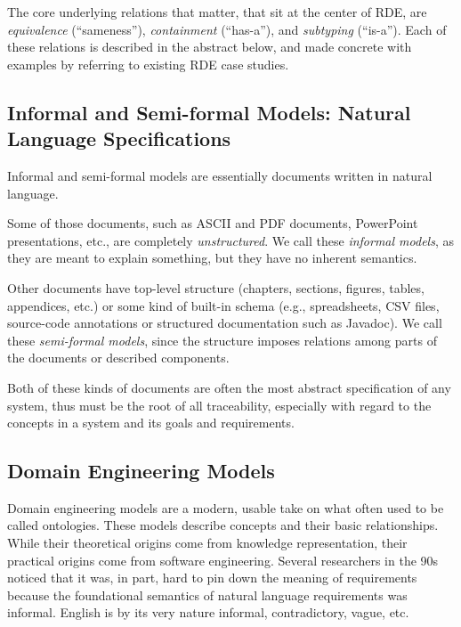 \documentclass[10pt,letterpaper]{article}
\begin{document}
The core underlying relations that matter, that sit at the center of RDE, are \emph{equivalence} (``sameness''), \emph{containment} (``has-a''), and \emph{subtyping} (``is-a''). Each of these relations is described in the abstract below, and made concrete with examples by referring to existing RDE case studies.

\subsection{Informal and Semi-formal Models: Natural Language Specifications}
\label{informal-and-semi-formal-models-natural-language-specifications}

Informal and semi-formal models are essentially documents written in natural language.

Some of those documents, such as ASCII and PDF documents, PowerPoint presentations, etc., are completely \emph{unstructured}. We call these \emph{informal models}, as they are meant to explain something, but they have no inherent semantics.

Other documents have top-level structure (chapters, sections, figures, tables, appendices, etc.) or some kind of built-in schema (e.g., spreadsheets, CSV files, source-code annotations or structured documentation such as Javadoc). We call these \emph{semi-formal models}, since the structure imposes relations among parts of the documents or described components.

Both of these kinds of documents are often the most abstract specification of any system, thus must be the root of all traceability, especially with regard to the concepts in a system and its goals and requirements.

\subsection{Domain Engineering Models}
\label{domain-engineering-models}

Domain engineering models are a modern, usable take on what often used to be called ontologies. These models describe concepts and their basic relationships. While their theoretical origins come from knowledge representation, their practical origins come from software engineering. Several researchers in the 90s noticed that it was, in part, hard to pin down the meaning of requirements because the foundational semantics of natural language requirements was informal. English is by its very nature informal, contradictory, vague, etc.
\end{document}
